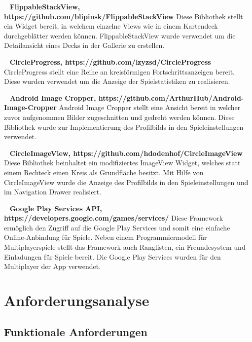 \documentclass{scrartcl}
\begin{document}
\ \newline
\textbf{FlippableStackView, https://github.com/blipinsk/FlippableStackView} \newline
Diese Bibliothek stellt ein Widget bereit, in welchem einzelne Views wie in
einem Kartendeck durchgeblätter werden können. FlippableStackView wurde
verwendet um die Detailansicht eines Decks in der Gallerie zu erstellen.

\ \newline
\textbf{CircleProgress, https://github.com/lzyzsd/CircleProgress} \newline
CircleProgress stellt eine Reihe an kreisförmigen Fortschrittsanzeigen bereit.
Diese wurden verwendet um die Anzeige der Spielstatistiken zu realisieren.

\ \newline
\textbf{Android Image Cropper, https://github.com/ArthurHub/Android-Image-Cropper} \newline
Android Image Cropper stellt eine Ansicht bereit in welcher zuvor aufgenommen
Bilder zugeschnitten und gedreht werden können. Diese Bibliothek wurde zur
Implementierung des Profilbilds in den Spieleinstellungen verwendet.

\ \newline
\textbf{CircleImageView, https://github.com/hdodenhof/CircleImageView} \newline
Diese Bibliothek beinhaltet ein modifiziertes ImageView Widget, welches statt
einem Rechteck einen Kreis als Grundfläche besitzt. Mit Hilfe von
CircleImageView wurde die Anzeige des Profilbilds in den Spieleinstellungen und
im Navigation Drawer realisiert.

\ \newline
\textbf{Google Play Services API, https://developers.google.com/games/services/} \newline
Diese Framework ermöglich den Zugriff auf die Google Play Services und somit
eine einfache Online-Anbindung für Spiele. Neben einem Programmiermodell für
Multiplayerspiele stellt das Framework auch Ranglisten, ein Freundesystem und
Einladungen für Spiele bereit. Die Google Play Services wurden für den
Multiplayer der App verwendet.


\textbf{}

\section{Anforderungsanalyse}
\subsection{Funktionale Anforderungen}
\end{document}
